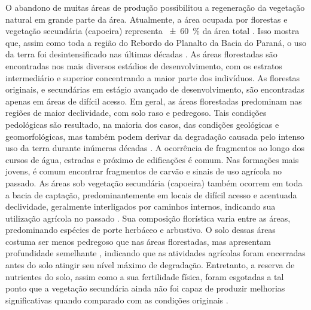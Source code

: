
O abandono de muitas áreas de produção possibilitou a regeneração da vegetação natural em grande parte da 
área. Atualmente, a área ocupada por florestas e vegetação secundária (capoeira) representa 
\SI{\pm60}{\percent} da área total \cite{SamuelRosaEtAl2011a}. Isso mostra que, assim como toda a região do 
Rebordo do Planalto da Bacia do Paraná, o uso da terra foi desintensificado nas últimas décadas 
\cite{SEMA/UFSM2001, DillEtAl2004, Poelking2007, Miguel2010, SamuelRosaEtAl2011a, Dullius2012, 
tenCatenEtAl2012}. As áreas florestadas são encontradas nos mais diversos estádios de desenvolvimento, com os 
estratos intermediário e superior concentrando a maior parte dos indivíduos. As florestas originais, e 
secundárias em estágio avançado de desenvolvimento, são encontradas apenas em áreas de difícil acesso. Em 
geral, as áreas florestadas predominam nas regiões de maior declividade, com solo raso e pedregoso. Tais 
condições pedológicas são resultado, na maioria dos casos, das condições geológicas e geomorfológicas, mas 
também podem derivar da degradação causada pelo intenso uso da terra durante inúmeras décadas 
\cite{SamuelRosaEtAl2011a}. A ocorrência de fragmentos ao longo dos cursos de água, estradas e próximo de 
edificações é comum. Nas formações mais jovens, é comum encontrar fragmentos de carvão e sinais de uso 
agrícola 
no passado. As áreas sob vegetação secundária (capoeira) também ocorrem em toda a bacia de captação, 
predominantemente em locais de difícil acesso e acentuada declividade, geralmente interligados por caminhos 
internos, indicando sua utilização agrícola no passado \cite{SamuelRosaEtAl2011a}. Sua composição florística 
varia entre as áreas, predominando espécies de porte herbáceo e arbustivo. O solo dessas áreas costuma ser 
menos pedregoso que nas áreas florestadas, mas apresentam profundidade semelhante \cite{SamuelRosaEtAl2011a}, 
indicando que as atividades agrícolas foram encerradas antes do solo atingir seu nível máximo de degradação. 
Entretanto, a reserva de nutrientes do solo, assim como a sua fertilidade física, foram esgotadas a tal ponto 
que a vegetação secundária ainda não foi 
capaz de produzir melhorias significativas quando comparado com as condições originais \cite{Menezes2008, 
Zalamena2008}.

